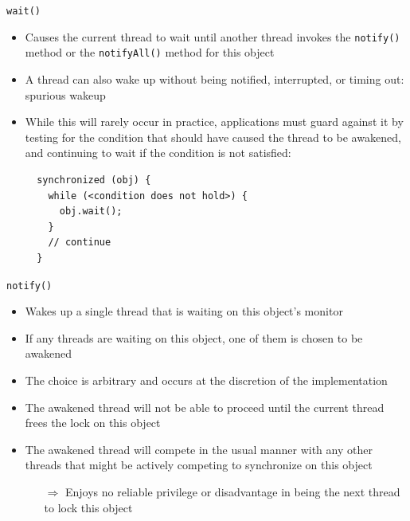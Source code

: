 \begin{frame}[fragile]{\lstinline!wait()!}
  \begin{itemize}
  \item Causes the current thread to wait until another thread invokes
    the \lstinline!notify()! method or the \lstinline!notifyAll()!
    method for this object
  \item A thread can also wake up without being notified, interrupted,
    or timing out: \alert{spurious wakeup}
  \item While this will rarely occur in practice, applications must
    guard against it by testing for the condition that should have
    caused the thread to be awakened, and continuing to wait if the
    condition is not satisfied:
\begin{lstlisting}
  synchronized (obj) {
    while (<condition does not hold>) {
      obj.wait();
    }
    // continue
  }
\end{lstlisting} 
  \end{itemize}
\end{frame}

\begin{frame}[fragile]{\lstinline!notify()!}
  \begin{itemize}
  \item Wakes up a single thread that is waiting on this object's
    monitor
  \item If any threads are waiting on this object, one of them is
    chosen to be awakened
  \item The \alert{choice is arbitrary} and occurs at the discretion
    of the implementation
  \item The awakened thread will not be able to proceed until the
    current thread frees the lock on this object
  \item The awakened thread will compete in the usual manner with any
    other threads that might be actively competing to synchronize on
    this object
    \begin{itemize}
    \item[$\Rightarrow$] Enjoys no reliable privilege or disadvantage
      in being the next thread to lock this object
    \end{itemize}  
  \end{itemize}
\end{frame}

